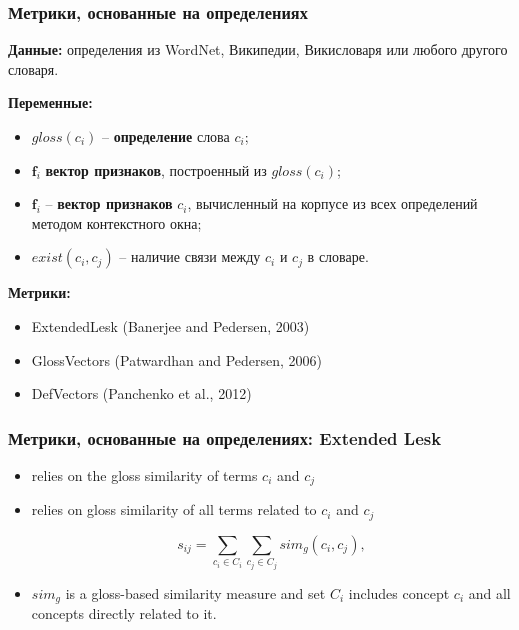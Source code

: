 \begin{frame}
\frametitle{Метрики, основанные на определениях}

\textbf{Данные:} определения из WordNet, Википедии, Викисловаря или любого
другого словаря.
    
\textbf{Переменные:}
\begin{itemize}
        \item $gloss(c_i)$ -- \textbf{определение} слова $c_i$;
        \item $\mathbf{f}_i$ \textbf{вектор признаков}, построенный из $gloss(c_i)$;
        \item $\mathbf{f}_i$ -- \textbf{вектор признаков} $c_i$, вычисленный на
        корпусе из всех определений методом контекстного окна;
        
        \item $exist(c_i, c_j)$ -- наличие связи между $c_i$ и $c_j$ в словаре.
\end{itemize}

\textbf{Метрики:}
\begin{itemize}
  \item ExtendedLesk (Banerjee and Pedersen, 2003)
  \item GlossVectors (Patwardhan and Pedersen, 2006)
  \item DefVectors (Panchenko et al., 2012)
  
\end{itemize}

\end{frame}





\begin{frame}
\frametitle{Метрики, основанные на определениях: Extended Lesk}

\begin{itemize}
\item relies on the gloss similarity of terms $c_i$ and $c_j$
\item relies on gloss similarity of all terms related to $c_i$ and $c_j$  

$$
s_{ij}=\sum_{c_i \in C_i}\sum_{c_j \in C_j} sim_g(c_i,c_j),
$$
\item $sim_g$ is a gloss-based similarity measure and set $C_i$ includes concept $c_i$ and all concepts directly related to it. 
\end{itemize}

\end{frame}


